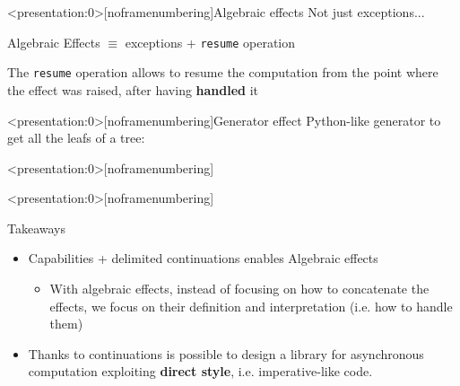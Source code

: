 \documentclass[aspectratio=1610,xcolor=dvipsnames]{beamer}
\begin{document}
%
\begin{frame}<presentation:0>[noframenumbering]{Algebraic effects}
  Not just exceptions...
  \begin{block}{}
    Algebraic Effects $\equiv$ exceptions + \texttt{resume} operation \cite{can-throw}
  \end{block}
  The \texttt{resume} operation allows to resume the computation from the point where the effect was raised, after having \textbf{handled} it
  
\end{frame}
%
\begin{frame}<presentation:0>[noframenumbering]{Generator effect \cite{scalar-gears}}
  Python-like generator to get all the leafs of a tree:
  
\end{frame}
%
\begin{frame}<presentation:0>[noframenumbering]
     
\end{frame}
%
\begin{frame}<presentation:0>[noframenumbering]
  \begin{block}{Takeaways}
    \begin{itemize}
      \item Capabilities + delimited continuations enables Algebraic effects
      \begin{itemize}
        \item With algebraic effects, instead of focusing on how to concatenate the effects, we focus on their definition and interpretation (i.e. how to handle them)
      \end{itemize}
      \item Thanks to continuations is possible to design a library for asynchronous computation exploiting \textbf{direct style}, i.e. imperative-like code.
    \end{itemize}
  \end{block}
\end{frame}
\end{document}
